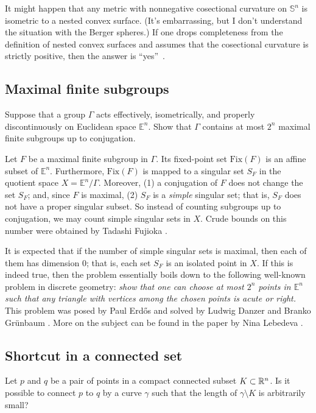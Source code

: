 It might happen that any metric with nonnegative cosectional curvature on $\mathbb{S}^n$ is isometric to a nested convex surface.
(It's embarrassing, but I don't understand the situation with the Berger spheres.)
If one drops completeness from the definition of nested convex surfaces
and assumes that the cosectional curvature is strictly positive,
then the answer is ``yes''~\cite{petrunin-poly}.

\subsection{Maximal finite subgroups}

\begin{pr}
Suppose that a group $\Gamma$ acts effectively, isometrically, and properly discontinuously on Euclidean space $\mathbb{E}^n$.
Show that $\Gamma$ contains at most $2^n$ maximal finite subgroups up to conjugation.
\end{pr}

Let $F$ be a maximal finite subgroup in $\Gamma$.
Its fixed-point set $\mathrm{Fix}(F)$ is an affine subset of $\mathbb{E}^n$.
Furthermore, $\mathrm{Fix}(F)$ is mapped to a singular set $S_F$ in the quotient space $X=\mathbb{E}^n/\Gamma$.
Moreover, (1) a conjugation of $F$ does not change the set $S_F$; and, since $F$ is maximal, (2) $S_F$ is a \emph{simple} singular set;
that is, $S_F$ does not have a proper singular subset.
So instead of counting subgroups up to conjugation, we may count simple singular sets in $X$.
Crude bounds on this number were obtained by Tadashi Fujioka \cite{fujioka2025}.

It is expected that if the number of simple singular sets is maximal, then each of them has dimension 0;
that is, each set $S_F$ is an isolated point in $X$.
If this is indeed true, then the problem essentially boils down to the following well-known problem in discrete geometry:
\emph{show that one can choose at most $2^n$ points in $\mathbb{E}^n$ such that any triangle with vertices among the chosen points is acute or right.}
This problem was posed by Paul Erdős and solved by Ludwig Danzer and Branko Grünbaum \cite{danzer-gruenbaum}.
More on the subject can be found in the paper by Nina Lebedeva \cite{lebedeva}.

\subsection{Shortcut in a connected set}

\begin{pr}
Let $p$ and $q$ be a pair of points in a compact connected subset $K\subset \mathbb{R}^n$.
Is it possible to connect $p$ to $q$ by a curve $\gamma$ such that the length of $\gamma\setminus K$ is arbitrarily small?
\end{pr}

